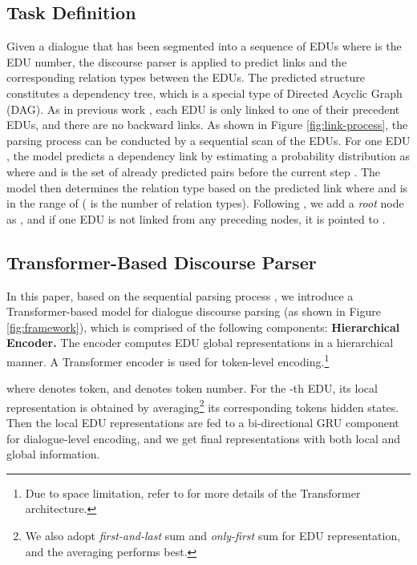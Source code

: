 \documentclass[11pt]{article}
\begin{document}
\subsection{Task Definition}
Given a dialogue that has been segmented into a sequence of EDUs  where  is the EDU number, the discourse parser is applied to predict links and the corresponding relation types between the EDUs. The predicted structure constitutes a dependency tree, which is a special type of Directed Acyclic Graph (DAG). 
As in previous work \cite{shi2019deepSeqParser}, each EDU is only linked to one of their precedent EDUs, and there are no backward links.
As shown in Figure \ref{fig:link-process}, the parsing process can be conducted by a sequential scan of the EDUs.
For one EDU , the model predicts a dependency link by estimating a probability distribution as  where  and  is the set of already predicted pairs before the current step . The model then determines the relation type based on the predicted link  where  and  is in the range of  ( is the number of relation types). Following \citet{li2014textParsing}, we add a \textit{root} node as , and if one EDU is not linked from any preceding nodes, it is pointed to .

\subsection{Transformer-Based Discourse Parser}
In this paper, based on the sequential parsing process \cite{shi2019deepSeqParser}, we introduce a Transformer-based model for dialogue discourse parsing (as shown in Figure \ref{fig:framework}), which is comprised of the following components:
\newline\noindent \textbf{Hierarchical Encoder.} The encoder computes EDU global representations in a hierarchical manner. A Transformer encoder \cite{vaswani-2017-Transformer} is used for token-level encoding.\footnote{Due to space limitation, refer to \cite{vaswani-2017-Transformer} for more details of the Transformer architecture.}

where  denotes token, and  denotes token number. For the -th EDU, its local representation  is obtained by averaging\footnote{We also adopt \textit{first-and-last} sum and \textit{only-first} sum for EDU representation, and the averaging performs best.} its corresponding tokens hidden states. Then the local EDU representations are fed to a bi-directional GRU component \cite{chung2014GRU} for dialogue-level encoding, and we get final representations  with both local and global information.
\end{document}
